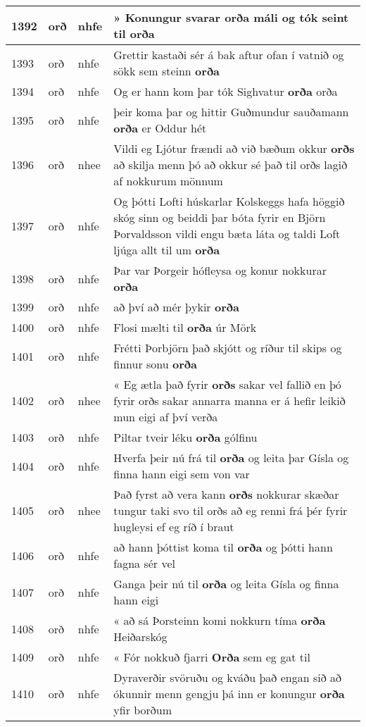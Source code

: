\documentclass{article}
\begin{document}
\begin{longtable}{p{1cm}|p{1cm}|p{1cm}|p{13cm}}
\hline
1392&orð&nhfe&» Konungur svarar \textbf{orða} máli og tók seint til orða\\
\hline
1393&orð&nhfe&Grettir kastaði sér á bak aftur ofan í vatnið og sökk sem steinn \textbf{orða} \\
\hline
1394&orð&nhfe&Og er hann kom þar tók Sighvatur \textbf{orða} orða\\
\hline
1395&orð&nhfe&þeir koma þar og hittir Guðmundur sauðamann \textbf{orða} er Oddur hét\\
\hline
1396&orð&nhee&Vildi eg Ljótur frændi að við bæðum okkur \textbf{orðs} að skilja menn þó að okkur sé það til orðs lagið af nokkurum mönnum\\
\hline
1397&orð&nhfe&Og þótti Lofti húskarlar Kolskeggs hafa höggið skóg sinn og beiddi þar bóta fyrir en Björn Þorvaldsson vildi engu bæta láta og taldi Loft ljúga allt til um \textbf{orða} \\
\hline
1398&orð&nhfe&Þar var Þorgeir hófleysa og konur nokkurar \textbf{orða} \\
\hline
1399&orð&nhfe&að því að mér þykir \textbf{orða} \\
\hline
1400&orð&nhfe&Flosi mælti til \textbf{orða} úr Mörk\\
\hline
1401&orð&nhfe&Frétti Þorbjörn það skjótt og ríður til skips og finnur sonu \textbf{orða} \\
\hline
1402&orð&nhee&« Eg ætla það fyrir \textbf{orðs} sakar vel fallið en þó fyrir orðs sakar annarra manna er á hefir leikið mun eigi af því verða\\
\hline
1403&orð&nhfe&Piltar tveir léku \textbf{orða} gólfinu\\
\hline
1404&orð&nhfe&Hverfa þeir nú frá til \textbf{orða} og leita þar Gísla og finna hann eigi sem von var\\
\hline
1405&orð&nhee&Það fyrst að vera kann \textbf{orðs} nokkurar skæðar tungur taki svo til orðs að eg renni frá þér fyrir hugleysi ef eg ríð í braut\\
\hline
1406&orð&nhfe&að hann þóttist koma til \textbf{orða} og þótti hann fagna sér vel\\
\hline
1407&orð&nhfe&Ganga þeir nú til \textbf{orða} og leita Gísla og finna hann eigi\\
\hline
1408&orð&nhfe&« að sá Þorsteinn komi nokkurn tíma \textbf{orða} Heiðarskóg\\
\hline
1409&orð&nhfe&« Fór nokkuð fjarri \textbf{Orða} sem eg gat til\\
\hline
1410&orð&nhfe&Dyraverðir svöruðu og kváðu það engan sið að ókunnir menn gengju þá inn er konungur \textbf{orða} yfir borðum\\

\end{longtable}
\end{document}

